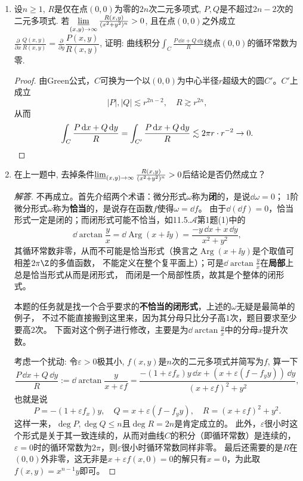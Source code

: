 \begin{quizb}
\begin{enumerate}
\item 设\(n\geqslant 1\), \(R\)是仅在点\((0,0)\)为零的\(2n\)次二元多项式, 
\(P,Q\)是不超过\(2n-2\)次的二元多项式. 
若\(\varliminf\limits_{(x,y)\rightarrow\infty}\frac{R(x,y)}{(x^2+y^2)^n}>0\), 
且在点\((0,0)\)之外成立\(\frac{\partial}{\partial x}\frac{Q(x,y)}{R(x,y)}
=\frac{\partial}{\partial y}\dfrac{P(x,y)}{R(x,y)}\), 
证明: 曲线积分\(\int_{C}\frac{P\,\dd x+Q\,\dd y}{R}\)绕点\((0,0)\)的循环常数为零.
\begin{proof}
由Green公式，$C$可换为一个以$(0,0)$为中心半径$r$超级大的圆$C'$。$C'$上成立
\[|P|,|Q| \lesssim r^{2n-2},\quad R \gtrsim r^{2n},\]
从而
\[\int_{C}\frac{P\,\mathrm{d} x+Q\,\mathrm{d} y}{R}=\int_{C'}\frac{P\,\mathrm{d} x+Q\,\mathrm{d} y}{R}
\lesssim 2\pi r \cdot r^{-2} \to 0.\qedhere\]
\end{proof}

\item 在上一题中, 去掉条件\(\varliminf_{(x,y)\rightarrow\infty}
\frac{R(x,y)}{(x^2+y^2)^n}>0\)后结论是否仍然成立？
\begin{proof}[解答]
不再成立。首先介绍两个术语：微分形式$\omega$称为\textbf{闭}的，是说$\dd\omega=0$；
$1$阶微分形式$\omega$称为\textbf{恰当}的，是说存在函数$f$使得$\omega=\dd f$。
由于$\dd(\dd f)=0$，恰当形式一定是闭的；而闭形式可能不恰当，如11.5.$\mathcal{A}$第1题(1)中的
\[\dd\arctan\frac{y}{x}=\dd\operatorname{Arg}(x+\ii y)=\frac{-y\,\dd x+x\,\dd y}{x^2+y^2},\]
其循环常数非零，从而不可能是恰当形式（换言之$\operatorname{Arg}(x+\ii y)$是个取值可相差$2\pi\Z$的多值函数，
不能定义在整个复平面上）；可是\(\dd\arctan\frac{y}{x}\)在\textbf{局部}上总是恰当形式从而是闭形式，
而闭是一个局部性质，故其是个整体的闭形式。

本题的任务就是找一个合乎要求的\textbf{不恰当的闭形式}，上述的$\omega$无疑是最简单的例子，
不过不能直接搬到这里来，因为其分母只比分子高$1$次，题目要求至少要高$2$次。
下面对这个例子进行修改，主要是为\(\dd\arctan\frac{y}{x}\)中的分母$x$提升次数。

考虑一个扰动: 令$\varepsilon>0$极其小, $f(x,y)$是$n$次的二元多项式并简写为$f$, 算一下
\[\frac{P\,\dd x+Q\,\dd y}{R}:=\dd\arctan\frac{y}{x+\varepsilon f}
=\frac{-(1+\varepsilon f_x)y\,\dd x+(x+\varepsilon(f-f_yy))\,\dd y}{(x+\varepsilon f)^2+y^2},\]
也就是说\[P=-(1+\varepsilon f_x)y, \quad Q=x+\varepsilon(f-f_yy), \quad R=(x+\varepsilon f)^2+y^2.\]
这样一来，$\deg P,\deg Q \leqslant n$且$\deg R=2n$是肯定成立的。
此外，$\varepsilon$很小时这个形式是关于其一致连续的，从而对曲线$C$的积分（即循环常数）是连续的，
$\varepsilon=0$时的循环常数为$2\pi$，则$\varepsilon$很小时循环常数同样非零。
最后还需要的是$R$在$(0,0)$外非零，这无非是$x+\varepsilon f(x,0)=0$的解只有$x=0$，为此取$f(x,y)=x^{n-1}y$即可。
\end{proof}
\end{enumerate}
\end{quizb}

